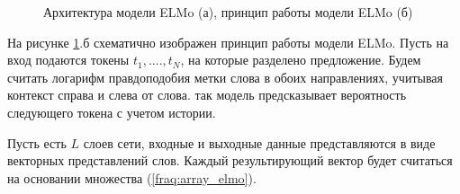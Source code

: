 \documentclass[a4paper,14pt]{article}
\begin{document}
\begin{figure}[H]
	\begin{minipage}[h]{0.499\linewidth}
	\end{minipage}
	\hfill
	\begin{minipage}[h]{0.499\linewidth}
	\end{minipage}
	\caption{Архитектура модели ELMo (а), принцип работы модели ELMo (б)}
	\label{fig:elmostructure}
\end{figure}

На рисунке \ref{fig:elmostructure}.б схематично изображен принцип работы модели ELMo.
Пусть на вход подаются токены $t_1, ...., t_N$, на которые разделено предложение.
Будем считать логарифм правдоподобия метки слова в обоих направлениях, учитывая контекст справа и слева от слова.
так модель предсказывает вероятность следующего токена с учетом истории.

Пусть есть $L$ слоев сети, входные и выходные данные представляются в виде векторных представлений слов.
Каждый результирующий вектор будет считаться на основании множества (\ref{fraq:array_elmo}).
\end{document}
